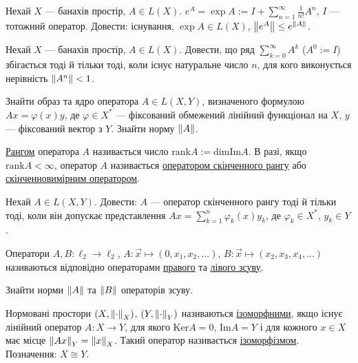 \begin{exercise}
    Нехай $X$ --- банахів простір, $A \in L(X)$. $e^A = \exp{A} := I + \sum\limits_{n=1}^{\infty} \frac{1}{n!}A^n$, $I$ --- тотожний оператор.
    Довести: існування, $\exp{A} \in L(X)$, $\left\lVert e^A\right\rVert \leq e^{\left\lVert A\right\rVert}$.
\end{exercise}

\begin{exercise}
    Нехай $X$ --- банахів простір, $A\in L(X)$. Довести, що ряд $\sum_{k=0}^{\infty} A^k$ ($A^0 := I$)
    збігається тоді й тільки тоді, коли існує натуральне число $n$, для кого виконується нерівність $\left\lVert A^n\right\rVert < 1$.
\end{exercise}

\begin{exercise}
    Знайти образ та ядро оператора $A \in L\left( X, Y\right)$, визначеного формулою $Ax = \varphi(x) y$,
    де $\varphi \in X^*$ --- фіксований обмежений лінійний функціонал на $X$, $y$ --- фіксований вектор з $Y$.
    Знайти норму $\left\lVert A\right\rVert$.
\end{exercise}

\begin{theory}
    \underline{Рангом} оператора $A$ називається число $\mathrm{rank}A := \mathrm{dim} \mathrm{Im}A$.
    В разі, якщо $\mathrm{rank} A < \infty$, оператор $A$ називається
    \underline{оператором скінченного рангу} або \underline{скінченновимірним оператором}.
\end{theory}

\begin{exercise}
    Нехай $A \in L\left( X, Y\right)$. Довести: $A$ --- оператор скінченного рангу тоді й тільки тоді, коли він допускає представлення
    $Ax = \sum\limits_{k=1}^n \varphi_k(x) y_k$, де $\varphi_k \in X^*$, $y_k \in Y$.
\end{exercise}

\begin{theory}
    Оператори $A, B: \ell_2 \rightarrow \ell_2$, $A : \vec{x} \mapsto (0, x_1, x_2, ...)$, $B : \vec{x} \mapsto (x_2, x_3, x_4, ...)$
    називаються відповідно операторами \underline{правого} та \underline{лівого зсуву}.
\end{theory}

\begin{exercise}
    Знайти норми $\left\lVert A\right\rVert$ та $\left\lVert B\right\rVert$ операторів зсуву.
\end{exercise}

\begin{theory}
    Нормовані простори $(X, \left\lVert\cdot\right\rVert_X)$, $(Y, \left\lVert\cdot\right\rVert_Y)$ називаються 
    \underline{ізоморфними}, якщо існує лінійний оператор $A: X \rightarrow Y$, для якого $\mathrm{Ker}A = {0}$,
    $\mathrm{Im}A = Y$ і для кожного $x \in X$ має місце $\left\lVert Ax\right\rVert_Y = \left\lVert x\right\rVert_X$. Такий оператор
    називається \underline{ізоморфізмом}. Позначення: $X \cong Y$.
\end{theory}

